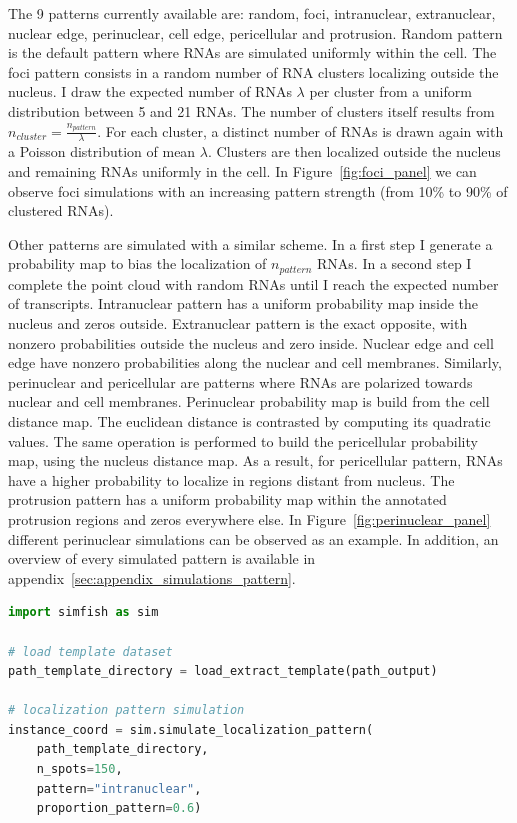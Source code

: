 The 9 patterns currently available are: random, foci, intranuclear, extranuclear, nuclear edge, perinuclear, cell edge, pericellular and protrusion.
Random pattern is the default pattern where \ac{RNA}s are simulated uniformly within the cell.
The foci pattern consists in a random number of \ac{RNA} clusters localizing outside the nucleus.
I draw the expected number of \ac{RNA}s $\lambda$ per cluster from a uniform distribution between 5 and 21 \ac{RNA}s.
The number of clusters itself results from $n_{cluster} = \frac{n_{pattern}}{\lambda}$.
For each cluster, a distinct number of \ac{RNA}s is drawn again with a Poisson distribution of mean $\lambda$.
Clusters are then localized outside the nucleus and remaining \ac{RNA}s uniformly in the cell.
In Figure~\ref{fig:foci_panel} we can observe foci simulations with an increasing pattern strength (from 10\% to 90\% of clustered \ac{RNA}s).

Other patterns are simulated with a similar scheme.
In a first step I generate a probability map to bias the localization of $n_{pattern}$ \ac{RNA}s.
In a second step I complete the point cloud with random \ac{RNA}s until I reach the expected number of transcripts.
Intranuclear pattern has a uniform probability map inside the nucleus and zeros outside.
Extranuclear pattern is the exact opposite, with nonzero probabilities outside the nucleus and zero inside.
Nuclear edge and cell edge have nonzero probabilities along the nuclear and cell membranes.
Similarly, perinuclear and pericellular are patterns where \ac{RNA}s are polarized towards nuclear and cell membranes.
Perinuclear probability map is build from the cell distance map.
The euclidean distance is contrasted by computing its quadratic values.
The same operation is performed to build the pericellular probability map, using the nucleus distance map.
As a result, for pericellular pattern, \ac{RNA}s have a higher probability to localize in regions distant from nucleus.
The protrusion pattern has a uniform probability map within the annotated protrusion regions and zeros everywhere else.
In Figure~\ref{fig:perinuclear_panel} different perinuclear simulations can be observed as an example.
In addition, an overview of every simulated pattern is available in appendix~\ref{sec:appendix_simulations_pattern}.\\

\begin{minipage}{0.9\textwidth}
\begin{lstlisting}[language=Python]
import simfish as sim

# load template dataset
path_template_directory = load_extract_template(path_output)

# localization pattern simulation
instance_coord = sim.simulate_localization_pattern(
	path_template_directory,
	n_spots=150,
	pattern="intranuclear",
	proportion_pattern=0.6)
\end{lstlisting}
\end{minipage}

